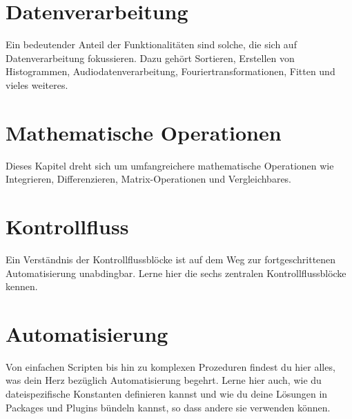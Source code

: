 \documentclass[DIV=17, parskip=half]{scrreprt}
\begin{document}
	\chapter{Datenverarbeitung}
		Ein bedeutender Anteil der Funktionalit\"aten sind solche, die sich auf Datenverarbeitung fokussieren. Dazu geh\"ort Sortieren, Erstellen von Histogrammen, Audiodatenverarbeitung, Fouriertransformationen, Fitten und vieles weiteres.
		
		
		
		
		
		
		
		
		
		
		
		
		
		
		
		
		
		
		
		
		
		
	
	\chapter{Mathematische Operationen}
		Dieses Kapitel dreht sich um umfangreichere mathematische Operationen wie Integrieren, Differenzieren, Matrix-Operationen und Vergleichbares.
		
		
		
		
		
		
		
		
		
	\chapter{Kontrollfluss}
		Ein Verst\"andnis der Kontrollflussbl\"ocke ist auf dem Weg zur fortgeschrittenen Automatisierung unabdingbar. Lerne hier die sechs zentralen Kontrollflussbl\"ocke kennen.
		
		
		
		
		
		
		
	
	\chapter{Automatisierung}
		Von einfachen Scripten bis hin zu komplexen Prozeduren findest du hier alles, was dein Herz bez\"uglich Automatisierung begehrt. Lerne hier auch, wie du dateispezifische Konstanten definieren kannst und wie du deine L\"osungen in Packages und Plugins b\"undeln kannst, so dass andere sie verwenden k\"onnen.
		
		
		
		
		
		
		
		
		
		
	
\end{document}

